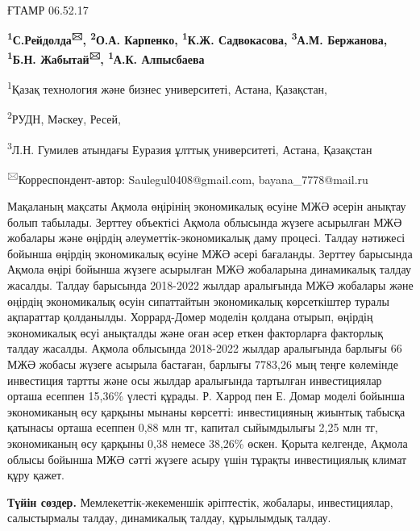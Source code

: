 \newpage
ҒТАМР 06.52.17


\begin{center}
{\bfseries \textsuperscript{1}С.Рейдолда\textsuperscript{🖂}, \textsuperscript{2}О.А. Карпенко, \textsuperscript{1}К.Ж. Садвокасова, \textsuperscript{3}А.М. Бержанова, \textsuperscript{1}Б.Н. Жабытай\textsuperscript{🖂}, \textsuperscript{1}А.К. Алпысбаева}

\textsuperscript{1}Қазақ технология және бизнес университеті, Астана,
Қазақстан,

\textsuperscript{2}РУДН, Мәскеу, Ресей,

\textsuperscript{3}Л.Н. Гумилев атындағы Еуразия ұлттық университеті,
Астана, Қазақстан
\end{center}

\textsuperscript{🖂}Корреспондент-автор: Saulegul0408@gmail.com, bayana\_7778@mail.ru

Мақаланың мақсаты Ақмола өңірінің экономикалық өсуіне МЖӘ әсерін анықтау
болып табылады. Зерттеу объектісі Ақмола облысында жүзеге асырылған МЖӘ
жобалары және өңірдің әлеуметтік-экономикалық даму процесі. Талдау
нәтижесі бойынша өңірдің экономикалық өсуіне МЖӘ әсері бағаланды.
Зерттеу барысында Ақмола өңірі бойынша жүзеге асырылған МЖӘ жобаларына
динамикалық талдау жасалды. Талдау барысында 2018-2022 жылдар аралығында
МЖӘ жобалары және өңірдің экономикалық өсуін сипаттайтын экономикалық
көрсеткіштер туралы ақпараттар қолданылды. Хоррард-Домер моделін қолдана
отырып, өңірдің экономикалық өсуі анықталды және оған әсер еткен
факторларға факторлық талдау жасалды. Ақмола облысында 2018-2022 жылдар
аралығында барлығы 66 МЖӘ жобасы жүзеге асырыла бастаған, барлығы
7783,26 мың теңге көлемінде инвестиция тартты және осы жылдар аралығында
тартылған инвестициялар орташа есеппен 15,36\% үлесті құрады. Р. Харрод
пен Е. Домар моделі бойынша экономиканың өсу қарқыны мынаны көрсетті:
инвестицияның жиынтық табысқа қатынасы орташа есеппен 0,88 млн тг,
капитал сыйымдылығы 2,25 млн тг, экономиканың өсу қарқыны 0,38 немесе
38,26\% өскен. Қорыта келгенде, Ақмола облысы бойынша МЖӘ сәтті жүзеге
асыру үшін тұрақты инвестициялық климат құру қажет.

{\bfseries Түйін сөздер.} Мемлекеттік-жекеменшік әріптестік, жобалары,
инвестициялар, салыстырмалы талдау, динамикалық талдау, құрылымдық
талдау.

